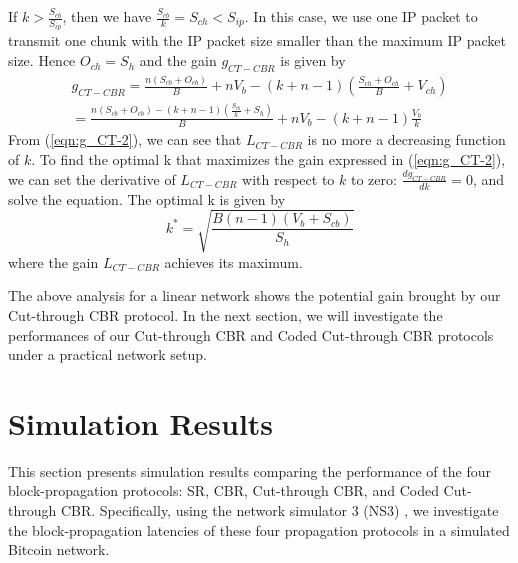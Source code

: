 \documentclass[10pt,journal,compsoc]{IEEEtran}
\begin{document}
If $k > \frac{{{S_{cb}}}}{{{S_{ip}}}}$, then we have $\frac{{{S_{cb}}}}{k} = {S_{ch}} < {S_{ip}}$. In this case, we use one IP packet to transmit one chunk with the IP packet size smaller than the maximum IP packet size. Hence ${O_{ch}} = {S_h}$ and the gain ${g_{CT - CBR}}$ is given by 
\begin{equation}
	\label{eqn:g_CT-2}
	\begin{array}{l}
		{g_{CT - CBR}} = \frac{{n({S_{cb}} + {O_{cb}})}}{B} + n{V_b} - (k + n - 1)(\frac{{{S_{ch}} + {O_{ch}}}}{B} + {V_{ch}})\\
		= \frac{{n({S_{cb}} + {O_{cb}}) - (k + n - 1)(\frac{{{S_{cb}}}}{k} + {S_h})}}{B} + n{V_b} - (k + n - 1)\frac{{{V_b}}}{k}
	\end{array}
\end{equation}
From (\ref{eqn:g_CT-2}), we can see that ${L_{CT - CBR}}$ is no more a decreasing function of $k$. To find the optimal k that maximizes the gain expressed in (\ref{eqn:g_CT-2}), we can set the derivative of  ${L_{CT - CBR}}$ with respect to $k$ to zero: $\frac{{d{g_{CT - CBR}}}}{{dk}} = 0$, and solve the equation. The optimal k is given by
\begin{equation}
	\label{eqn:choice_k}
	{k^*} = \sqrt {\frac{{B(n - 1)({V_b} + {S_{cb}})}}{{{S_h}}}}
\end{equation}
where the gain ${L_{CT - CBR}}$ achieves its maximum.

The above analysis for a linear network shows the potential gain brought by our Cut-through CBR protocol. In the next section, we will investigate the performances of our Cut-through CBR and Coded Cut-through CBR protocols under a practical network setup. 

\section{Simulation Results}
\label{section:simulation}
This section presents simulation results comparing the performance of the four block-propagation protocols: SR, CBR, Cut-through CBR, and Coded Cut-through CBR. Specifically, using the network simulator 3 (NS3) \cite{henderson2008network}, we investigate the block-propagation latencies of these four propagation protocols in a simulated Bitcoin network. 
\end{document}
